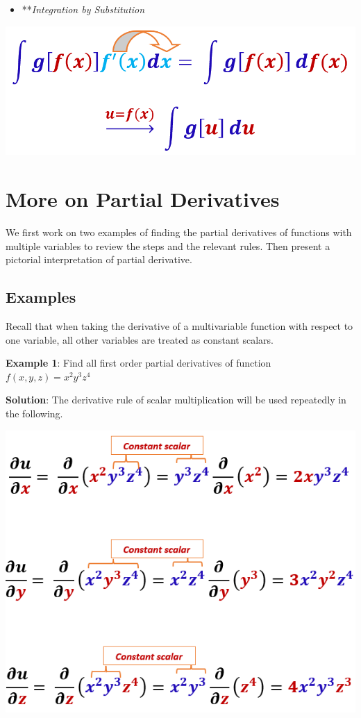\documentclass[
]{book}
\providecommand{\tightlist}{%
  \setlength{\itemsep}{0pt}\setlength{\parskip}{0pt}}
\begin{document}
\begin{itemize}
\tightlist
\item
  **\emph{Integration by Substitution}
\end{itemize}

\begin{center}\includegraphics[width=0.65\linewidth]{img14/w13-integrationSubstitution} \end{center}

\hfill\break

\hypertarget{more-on-partial-derivatives}{%
\section{More on Partial Derivatives}\label{more-on-partial-derivatives}}

We first work on two examples of finding the partial derivatives of functions with multiple variables to review the steps and the relevant rules. Then present a pictorial interpretation of partial derivative.

\hypertarget{examples}{%
\subsection{Examples}\label{examples}}

Recall that when taking the derivative of a multivariable function with respect to one variable, all other variables are treated as constant scalars.

\textbf{Example 1}: Find all first order partial derivatives of function \(f(x,y,z) = x^2y^3z^4\)

\textbf{Solution}: The derivative rule of scalar multiplication will be used repeatedly in the following.

\begin{center}\includegraphics[width=0.75\linewidth]{img14/w14-PartialExample01} \end{center}
\end{document}
